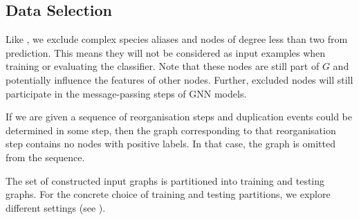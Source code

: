 \documentclass[
	fontsize=10pt, %
	twoside=true, %
	secnumdepth=1, %
  toc=indentunnumbered %
]{kaobook}
\begin{document}


\subsection{Data Selection}

Like \nielsen{}, we exclude complex species aliases and nodes of degree less than
two from prediction. This means they will not be considered as input examples
when training or evaluating the classifier. Note that these nodes are still part
of $G$ and potentially influence the features of other nodes. Further, excluded
nodes will still participate in the message-passing steps of GNN models.

If we are given a sequence of reorganisation steps and duplication events could
be determined in some step, then the graph corresponding to that reorganisation
step contains no nodes with positive labels. In that case, the graph is omitted
from the sequence. 

The set of constructed input graphs is partitioned into training and
testing graphs. For the concrete choice of training and testing partitions, we
explore different settings (see ).
\end{document}
